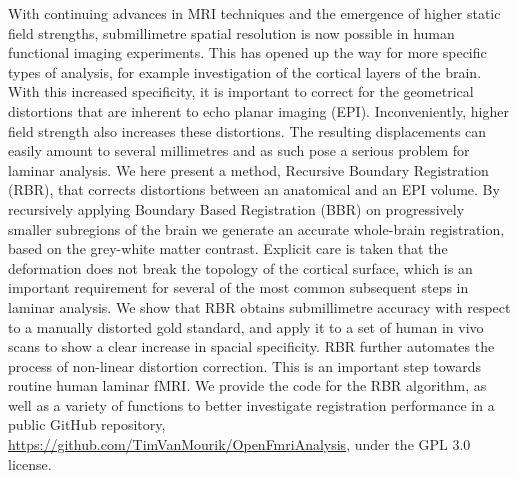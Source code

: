 With continuing advances in MRI techniques and the emergence of higher static field strengths, submillimetre spatial resolution is now possible in human functional imaging experiments. This has opened up the way for more specific types of analysis, for example investigation of the cortical layers of the brain. With this increased specificity, it is important to correct for the geometrical distortions that are inherent to echo planar imaging (EPI). Inconveniently, higher field strength also increases these distortions. The resulting displacements can easily amount to several millimetres and as such pose a serious problem for laminar analysis.
We here present a method, Recursive Boundary Registration (RBR), that corrects distortions between an anatomical and an EPI volume. By recursively applying Boundary Based Registration (BBR) on progressively smaller subregions of the brain we generate an accurate whole-brain registration, based on the grey-white matter contrast. Explicit care is taken that the deformation does not break the topology of the cortical surface, which is an important requirement for several of the most common subsequent steps in laminar analysis. 
We show that RBR obtains submillimetre accuracy with respect to a manually distorted gold standard, and apply it to a set of human in vivo scans to show a clear increase in spacial specificity. 
RBR further automates the process of non-linear distortion correction. This is an important step towards routine human laminar fMRI. We  provide the code for the RBR algorithm, as well as a variety of functions to better investigate registration performance in a public GitHub repository, \url{https://github.com/TimVanMourik/OpenFmriAnalysis}, under the GPL 3.0 license.